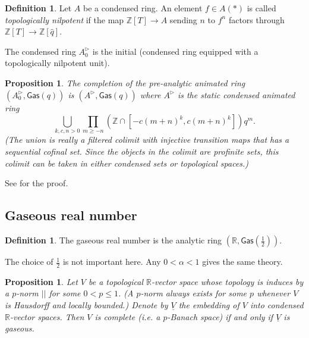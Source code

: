\documentclass{article}
\theoremstyle{plain}
\newtheorem{prop}[thm]{Proposition}
\theoremstyle{definition}
\newtheorem{defi}[thm]{Definition}
\theoremstyle{remark}
\newcommand{\huflag}{\triangleright}
\begin{document}
\begin{defi}
Let $ A $ be a condensed ring. An element $ f \in  A (*) $ is called \emph{topologically nilpotent}
if the map $ \mathbb{Z}[T]\to A $ sending $ n $ to $ f ^{n} $ factors through $ \mathbb{Z}[T]\to \mathbb{Z}[\hat{q}]$.
\end{defi}

The condensed ring $ A _{0}^{\huflag} $ is the initial (condensed ring equipped with a topologically nilpotent unit).

\begin{prop}
The completion of the pre-analytic animated ring
$ (A _{0}^{\huflag}, \mathsf{Gas}(q)) $
is $ (A ^{\huflag}, \mathsf{Gas}(q)) $ where $ A ^{\huflag} $ is the static condensed animated ring
\begin{equation*}
\bigcup _{k,c,n>0} \prod _{m\geq -n} (\mathbb{Z}\cap [-c(m+n) ^{k}, c (m+n)^{k}]) q ^{m}.
\end{equation*}
(The union is really a filtered colimit with injective transition maps that has a sequential cofinal set.
Since the objects in the colimit are profinite sets,
this colimit can be taken in either condensed sets or topological spaces.)
\end{prop}

See
\cite[\href{https://www.youtube.com/watch?v=krq6jCy-dhE\&list=PLx5f8IelFRgGmu6gmL-Kf\_Rl\_6Mm7juZO\&index=14\&t=1368s}{Video 14, 22:48}]{ihesvid}
for the proof.

\subsection{Gaseous real number}

\begin{defi}
The gaseous real number is the analytic ring $ (\mathbb{R}, \mathsf{Gas}(\frac{1}{2})) $.
\end{defi}

The choice of $ \frac{1}{2} $ is not important here. Any $ 0<\alpha <1 $ gives the same theory.

\begin{prop}
Let $ V $ be a topological $ \mathbb{R} $-vector space whose topology is induces by a $ p $-norm $ || $ for some $ 0<p\leq 1 $.
(A $ p $-norm always exists for some $ p $ whenever $ V $ is Hausdorff and locally bounded.)
Denote by $ \underline{V} $ the embedding of $ V $ into condensed $ \mathbb{R} $-vector spaces.
Then $ V $ is complete (i.e. a $ p $-Banach space) if and only if $ \underline{V} $ is gaseous.
\end{prop}
\end{document}
